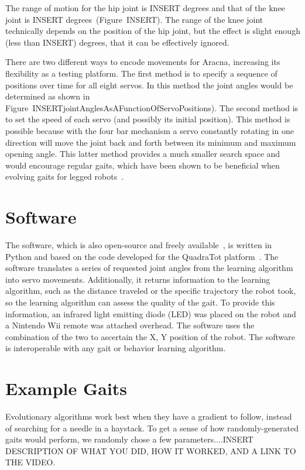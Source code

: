 \documentclass[letterpaper]{article}
\begin{document}
The range of motion for the hip joint is INSERT degrees and that of the knee joint is INSERT degrees~(Figure~INSERT). The range of the knee joint technically depends on the position of the hip joint, but the effect is slight enough (less than INSERT) degrees, that it can be effectively ignored. 

There are two different ways to encode movements for Aracna, increasing its flexibility as a testing platform. The first method is to specify a sequence of positions over time for all eight servos. In this method the joint angles would be determined as shown in Figure~INSERTjointAnglesAsAFunctionOfServoPositions). The second method is to set the speed of each servo (and possibly its initial position). This method is possible because with the four bar mechanism a servo constantly rotating in one direction will move the joint back and forth between its minimum and maximum opening angle. This latter method provides a much smaller search space and would encourage regular gaits, which have been shown to be beneficial when evolving gaits for legged robots~\citep{clune2011performance, hornby2005autonomous}. 


\section{Software}

The software, which is also open-source and freely available~\citep{WEB}, is written in Python and based on the
code developed for the QuadraTot platform~\citep{yosinski2011gaits}. The software translates a series of requested joint angles from the learning algorithm into servo movements. Additionally, it returns information to the learning algorithm, such as the distance traveled or the specific trajectory the robot took, so the learning algorithm can assess the quality of the gait. To provide this information, an infrared light
emitting diode (LED) was placed on the robot and a Nintendo Wii
remote was attached overhead. The software uses the combination of the two to ascertain the X, Y position of the robot. The software is interoperable with any gait or behavior learning algorithm.  

\section{Example Gaits}

Evolutionary algorithms work best when they have a gradient to follow, instead of searching for a needle in a haystack. To get a sense of how randomly-generated gaits would perform, we randomly chose a few parameters....INSERT DESCRIPTION OF WHAT YOU DID, HOW IT WORKED, AND A LINK TO THE VIDEO. 
\end{document}
